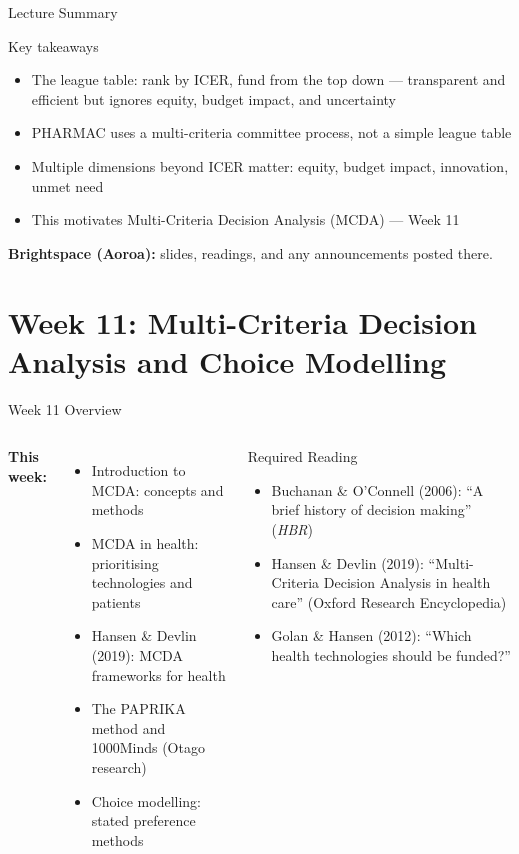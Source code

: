 \documentclass[aspectratio=169, 12pt]{beamer}
\newcommand{\summaryside}[1]{%
  \begin{frame}{Lecture Summary}
    \begin{exampleblock}{Key takeaways}
      \begin{itemize}#1\end{itemize}
    \end{exampleblock}
    \vspace{0.5em}
    {\footnotesize\textcolor{OtagoGold}{\textbf{Brightspace (Aoroa):}} slides, readings, and any announcements posted there.}
  \end{frame}}
\begin{document}
\summaryside{
  \item The league table: rank by ICER, fund from the top down --- transparent and efficient but ignores equity, budget impact, and uncertainty
  \item PHARMAC uses a multi-criteria committee process, not a simple league table
  \item Multiple dimensions beyond ICER matter: equity, budget impact, innovation, unmet need
  \item This motivates Multi-Criteria Decision Analysis (MCDA) --- Week 11
}


\section{Week 11: Multi-Criteria Decision Analysis and Choice Modelling}

\begin{frame}{Week 11 Overview}
  \begin{columns}
      \textbf{This week:}
      \begin{itemize}
        \item Introduction to MCDA: concepts and methods
        \item MCDA in health: prioritising technologies and patients
        \item Hansen \& Devlin (2019): MCDA frameworks for health
        \item The PAPRIKA method and 1000Minds (Otago research)
        \item Choice modelling: stated preference methods
      \end{itemize}
      \begin{block}{Required Reading}
        {\small
        \begin{itemize}
          \item Buchanan \& O'Connell (2006): ``A brief history of decision making'' (\textit{HBR})
          \item Hansen \& Devlin (2019): ``Multi-Criteria Decision Analysis in health care'' (Oxford Research Encyclopedia)
          \item Golan \& Hansen (2012): ``Which health technologies should be funded?''
        \end{itemize}}
      \end{block}
  \end{columns}
\end{frame}
\end{document}
